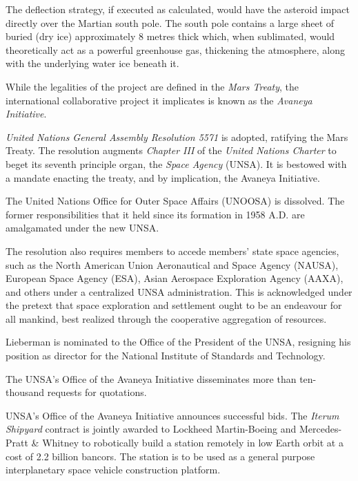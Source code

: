 The deflection strategy, if executed as calculated, would have the asteroid impact directly over the Martian south pole. The south pole contains a large sheet of buried  (dry ice) approximately 8 metres thick which, when sublimated, would theoretically act as a powerful greenhouse gas, thickening the atmosphere, along with the underlying water ice beneath it.

While the legalities of the project are defined in the {\it Mars Treaty}, the international collaborative project it implicates is known as the {\it Avaneya Initiative}.
\StopTimelineDate

{\it United Nations General Assembly Resolution 5571} is adopted, ratifying the Mars Treaty. The resolution augments {\it Chapter III} of the {\it United Nations Charter} to beget its seventh principle organ, the {\it Space Agency} (UNSA). It is bestowed with a mandate enacting the treaty, and by implication, the Avaneya Initiative.

The United Nations Office for Outer Space Affairs (UNOOSA) is dissolved. The former responsibilities that it held since its formation in 1958 A.D. are amalgamated under the new UNSA.

The resolution also requires members to accede members' state space agencies, such as the North American Union Aeronautical and Space Agency (NAUSA), European Space Agency (ESA), Asian Aerospace Exploration Agency (AAXA), and others under a centralized UNSA administration. This is acknowledged under the pretext that space exploration and settlement ought to be an endeavour for all mankind, best realized through the cooperative aggregation of resources.

Lieberman is nominated to the Office of the President of the UNSA, resigning his position as director for the National Institute of Standards and Technology.
\StopTimelineDate

The UNSA's Office of the Avaneya Initiative disseminates more than ten-thousand requests for quotations.
\StopTimelineDate

UNSA's Office of the Avaneya Initiative announces successful bids. The {\it Iterum Shipyard} contract is jointly awarded to Lockheed Martin-Boeing and Mercedes-Pratt & Whitney to robotically build a station remotely in low Earth orbit at a cost of 2.2 billion bancors. The station is to be used as a general purpose interplanetary space vehicle construction platform.

